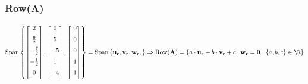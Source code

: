 \documentclass{article}
\begin{document}
\subsubsection{Row(\textbf{A})} 

\[%
    \text{Span} \left\{
    \begin{bmatrix} \vspace{2mm}
        2 \\ \vspace{2mm}
        \frac{9}{2}  \\ \vspace{2mm}
        -\frac{7}{2}  \\ \vspace{2mm}
        -\frac{1}{2}  \\ \vspace{2mm}
        0 \\ 
    \end{bmatrix},
    \begin{bmatrix} \vspace{2mm}
        0  \\ \vspace{2mm}
        5  \\ \vspace{2mm}
        -5 \\ \vspace{2mm}
        1  \\ \vspace{2mm}
        -4 \\ 
    \end{bmatrix},
    \begin{bmatrix} \vspace{2mm}
        \ 0 \\ \vspace{2mm} 
        \ 0 \\ \vspace{2mm} 
        \ 0 \\ \vspace{2mm} 
        \ 1 \\ \vspace{2mm} 
        \ 1 \\		
    \end{bmatrix}
    \right\}
    =
    \text{Span} \left\{ 
    \mathbf{u_{r}},
    \mathbf{v_{r}},
    \mathbf{w_{r}},
    \right\}
    \Rightarrow 
    \text{Row}(\mathbf{A})=
    \left\{
    a \cdot \mathbf{u_{r}} +
    b \cdot \mathbf{v_{r}} +
    c \cdot \mathbf{w_{r}}
    =
    \mathbf{0}
    \mid   
    \left\{ a,b,c \right\} \in \R
    \right\}
\]%
\end{document}
